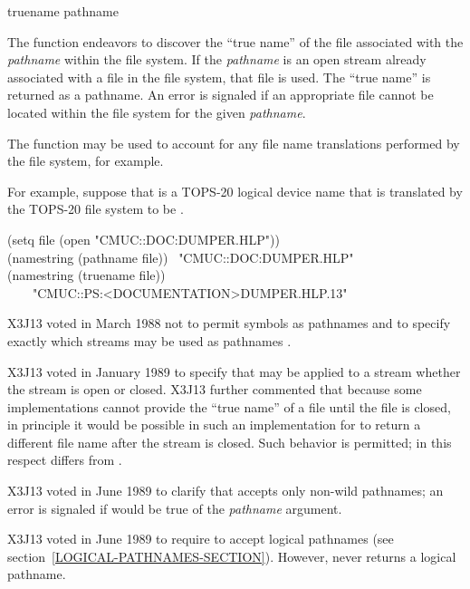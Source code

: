 \begin{defun}[Function]
truename pathname

The  function
endeavors to discover the ``true name'' of the file
associated with the \emph{pathname} within the file system.
If the \emph{pathname} is an open stream already associated with a file
in the file system, that file is used.
The ``true name'' is returned as a pathname.
An error is signaled if an appropriate file cannot be located
within the file system for the given \emph{pathname}.

The  function may be used to
account for any file name translations performed by the file system,
for example.

For example, suppose that  is a {TOPS-20} logical
device name that is translated by the {TOPS-20} file system
to be .
\begin{lisp}
(setq file (open "CMUC::DOC:DUMPER.HLP")) \\
(namestring (pathname file)) \EV\ "CMUC::DOC:DUMPER.HLP" \\
(namestring (truename file)) \\
~~~\EV\ "CMUC::PS:<DOCUMENTATION>DUMPER.HLP.13"
\end{lisp}

\begin{new}
X3J13 voted in March 1988
not to permit symbols as pathnames
 and
to specify exactly which streams may be used as pathnames
.
\end{new}

\begin{new}
X3J13 voted in January 1989
to specify that  may be
applied to a stream whether the stream is open or closed.
X3J13 further commented that because some implementations cannot
provide the ``true name'' of a file until the file is closed, in principle
it would be possible in such an implementation for  to
return a different file name after the stream is closed.
Such behavior is permitted; in this respect 
differs from .
\end{new}

\begin{newer}
X3J13 voted in June 1989 
to clarify that  accepts only non-wild pathnames;
an error is signaled if  would be true of
the \emph{pathname} argument.
\end{newer}

\begin{newer}
X3J13 voted in June 1989  to require 
to accept logical pathnames (see section~\ref{LOGICAL-PATHNAMES-SECTION}).
However,  never returns a logical pathname.
\end{newer}
\end{defun}

